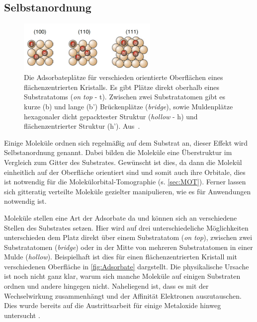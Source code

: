         \subsection{Selbstanordnung}
            \begin{figure}
                \centering
                \includegraphics[width=0.6\textwidth]{Adsorbate}
                \caption{Die Adsorbateplätze für verschieden orientierte Oberflächen eines flächenzentrierten Kristalls.
                Es gibt Plätze direkt oberhalb eines Substratatoms (\textit{on top} - t).
                Zwischen zwei Substratatomen gibt es kurze (b) und lange (b') Brückenplätze (\textit{bridge}), sowie Muldenplätze hexagonaler dicht gepacktester Struktur (\textit{hollow} - h) und flächenzentrierter Struktur (h'). Aus~\cite{Fauster}.}
                \label{fig:Adsorbate}
            \end{figure}
            Einige Moleküle ordnen sich regelmäßig auf dem Substrat an, dieser Effekt wird Selbstanordnung genannt.
            Dabei bilden die Moleküle eine Überstruktur im Vergleich zum Gitter des Substrates.
            Gewünscht ist dies, da dann die Molekül einheitlich auf der Oberfläche orientiert sind und somit auch ihre Orbitale, dies ist notwendig für die Molekülorbital-Tomographie (s. \autoref{sec:MOT}).
            Ferner lassen sich gitteratig verteilte Moleküle gezielter manipulieren, wie es für Anwendungen notwendig ist.
            
            Moleküle stellen eine Art der Adsorbate da und können sich an verschiedene Stellen des Substrates setzen.
            Hier wird auf drei unterschiedeliche Möglichkeiten unterschieden dem Platz direkt über einem Substratatom (\textit{on top}), zwischen zwei Substratatomen (\textit{bridge}) oder in der Mitte von mehreren Substratatomen in einer Mulde (\textit{hollow}).
            Beispielhaft ist dies für einen flächenzentrierten Kristall mit verschiedenen Oberfläche in \autoref{fig:Adsorbate} dargstellt.
            Die physikalische Ursache ist noch nicht ganz klar, warum sich manche Moleküle auf einigen Substraten ordnen und andere hingegen nicht.
            Naheliegend ist, dass es mit der Wechselwirkung zusammenhängt und der Affinität Elektronen auszutauschen.
            Dies wurde bereits auf die Austrittsarbeit für einige Metaloxide hinweg untersucht \cite{greiner_universal_2012}.

